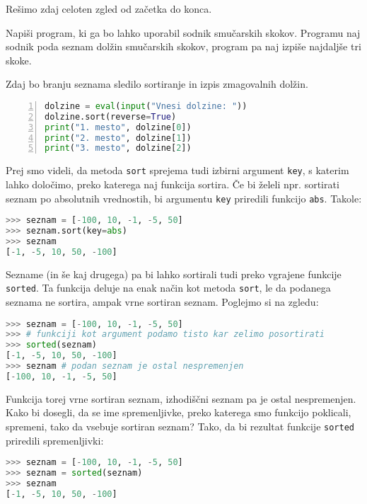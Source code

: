 Rešimo zdaj celoten zgled od začetka do konca.
\begin{zgled}
Napiši program, ki ga bo lahko uporabil sodnik smučarskih skokov. Programu naj sodnik poda seznam dolžin smučarskih skokov, program pa naj izpiše najdaljše tri skoke.
\end{zgled}

\begin{resitev}
Zdaj bo branju seznama sledilo sortiranje in izpis zmagovalnih dolžin.
\begin{lstlisting}[language=Python, showstringspaces=false,numbers=left]
dolzine = eval(input("Vnesi dolzine: "))
dolzine.sort(reverse=True)
print("1. mesto", dolzine[0])
print("2. mesto", dolzine[1])
print("3. mesto", dolzine[2])
\end{lstlisting}
\end{resitev}

Prej smo videli, da metoda \texttt{sort} sprejema tudi izbirni argument \texttt{key}, s katerim lahko določimo, preko katerega naj funkcija sortira. Če bi želeli npr. sortirati seznam po absolutnih vrednostih, bi argumentu \texttt{key} priredili funkcijo \texttt{abs}. Takole:
\begin{lstlisting}[language=Python, showstringspaces=false]
>>> seznam = [-100, 10, -1, -5, 50]
>>> seznam.sort(key=abs)
>>> seznam
[-1, -5, 10, 50, -100]
\end{lstlisting}

Sezname (in še kaj drugega) pa bi lahko sortirali tudi preko vgrajene funkcije \texttt{sorted}. Ta funkcija deluje na enak način kot metoda \texttt{sort}, le da podanega seznama ne sortira, ampak vrne sortiran seznam. Poglejmo si na zgledu:
\begin{lstlisting}[language=Python, showstringspaces=false]
>>> seznam = [-100, 10, -1, -5, 50]
>>> # funkciji kot argument podamo tisto kar zelimo posortirati
>>> sorted(seznam) 
[-1, -5, 10, 50, -100]
>>> seznam # podan seznam je ostal nespremenjen
[-100, 10, -1, -5, 50]
\end{lstlisting}
Funkcija torej vrne sortiran seznam, izhodiščni seznam pa je ostal nespremenjen. Kako bi dosegli, da se ime spremenljivke, preko katerega smo funkcijo poklicali, spremeni, tako da vsebuje sortiran seznam? Tako, da bi rezultat funkcije \texttt{sorted} priredili spremenljivki:
\begin{lstlisting}[language=Python, showstringspaces=false]
>>> seznam = [-100, 10, -1, -5, 50]
>>> seznam = sorted(seznam)
>>> seznam
[-1, -5, 10, 50, -100]
\end{lstlisting}

